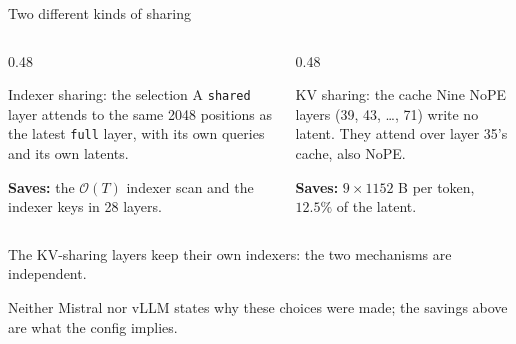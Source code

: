 \documentclass[handout]{beamer}
\begin{document}
\begin{frame}{Two different kinds of sharing}
  \begin{columns}[t]
    \begin{column}{0.48\linewidth}
      \begin{block}{Indexer sharing: the selection}
        \small
        A \texttt{shared} layer attends to the same 2048 positions as the latest \texttt{full} layer, with its own queries and its own latents.\par\vspace{4pt}
        \textbf{Saves:} the $\mathcal{O}(T)$ indexer scan and the indexer keys in 28 layers.
      \end{block}
    \end{column}
    \begin{column}{0.48\linewidth}
      \begin{exampleblock}{KV sharing: the cache}
        \small
        Nine NoPE layers (39, 43, \ldots, 71) write no latent. They attend over layer 35's cache, also NoPE.\par\vspace{4pt}
        \textbf{Saves:} $9\times1152$ B per token, $12.5\%$ of the latent.
      \end{exampleblock}
    \end{column}
  \end{columns}
  \vfill
  \small The KV-sharing layers keep their own indexers: the two mechanisms are independent.\par
  \vspace{4pt}
  \footnotesize\textcolor{inkmuted}{Neither Mistral nor vLLM states why these choices were made; the savings above are what the config implies.}
\end{frame}
\end{document}
